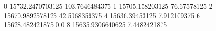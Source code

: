 0 15732.2470703125 103.7646484375
1 15705.158203125 76.67578125
2 15670.9892578125 42.5068359375
4 15636.39453125 7.912109375
6 15628.482421875 0.0
8 15635.9306640625 7.4482421875
